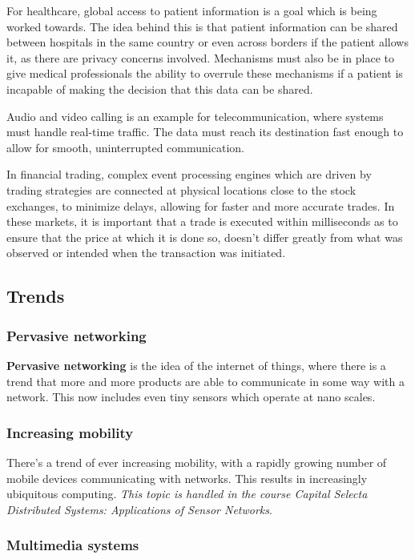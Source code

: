 \documentclass[a4paper]{article}
\begin{document}
For healthcare, global access to patient information is a goal which is being worked towards. The idea behind this is that patient information can be shared between hospitals in the same country or even across borders if the patient allows it, as there are privacy concerns involved. Mechanisms must also be in place to give medical professionals the ability to overrule these mechanisms if a patient is incapable of making the decision that this data can be shared.

Audio and video calling is an example for telecommunication, where systems must handle real-time traffic. The data must reach its destination fast enough to allow for smooth, uninterrupted communication.

In financial trading, complex event processing engines which are driven by trading strategies are connected at physical locations close to the stock exchanges, to minimize delays, allowing for faster and more accurate trades. In these markets, it is important that a trade is executed within milliseconds as to ensure that the price at which it is done so, doesn't differ greatly from what was observed or intended when the transaction was initiated.

\subsection{Trends}

\subsubsection{Pervasive networking}

\textbf{Pervasive networking} is the idea of the internet of things, where there is a trend that more and more products are able to communicate in some way with a network. This now includes even tiny sensors which operate at nano scales.

\subsubsection{Increasing mobility}

There's a trend of ever increasing mobility, with a rapidly growing number of mobile devices communicating with networks. This results in increasingly ubiquitous computing. \textit{This topic is handled in the course Capital Selecta Distributed Systems: Applications of Sensor Networks}.

\subsubsection{Multimedia systems}
\end{document}
